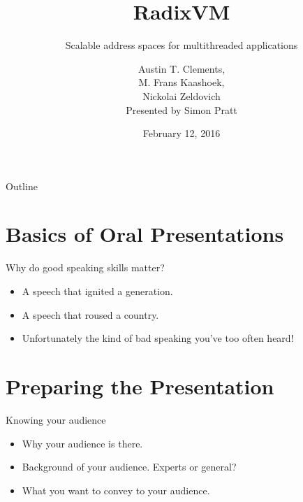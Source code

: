 \documentclass{beamer}
\title{RadixVM}
\subtitle
{Scalable address spaces for multithreaded applications}
\author[Presented by Simon Pratt]{Austin T. Clements,\\M. Frans Kaashoek,\\Nickolai Zeldovich\\
  \vspace{2em}Presented by Simon Pratt}
\date{February 12, 2016} %
\newcommand{\bi}{\begin{itemize}}
\newcommand{\ei}{\end{itemize}}
\begin{document}
\frame[plain]{\titlepage}

\newpage

\begin{frame}{Outline}
  \tableofcontents[pausesections]
\end{frame}





\section{Basics of Oral Presentations} 

\begin{frame}{Why do good speaking skills matter?}
\begin{itemize}
\item A speech that ignited a generation.
\item A speech that roused a country.
\item Unfortunately the kind of bad speaking you've too often heard!
\end{itemize}
\end{frame}

\section{Preparing the Presentation}

\begin{frame}{Knowing your audience}
\bi
\item Why your audience is there.
\item Background of your audience. Experts or general?
\item What you want to convey to your audience.
\ei
\end{frame}
\end{document}
